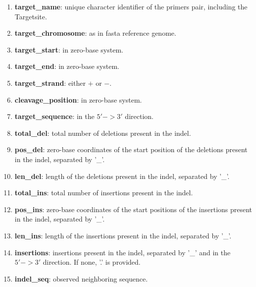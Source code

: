\documentclass[11pt, twoside]{article}
\begin{document}
\begin{enumerate}
\item {\bf target\_name}: unique character identifier of the primers
  pair, including the Targetsite.

\item {\bf target_chromosome}: as in fasta reference genome.

\item {\bf target_start}: in zero-base system.

\item {\bf target_end}: in zero-base system.

\item {\bf target_strand}: either $+$ or $-$.

\item {\bf cleavage\_position}: in zero-base system.

\item {\bf target\_sequence}: in the $5' -> 3'$ direction.

\item {\bf total\_del}: total number of deletions present in the indel.

\item {\bf pos\_del}: zero-base coordinates of the start position of the deletions present in the indel, separated by '\_'.

\item {\bf len\_del}: length of the deletions present in the indel, separated by '\_'.

\item {\bf total\_ins}: total number of insertions present in the indel.

\item {\bf pos\_ins}: zero-base coordinates of the start positions of the insertions present in the indel, separated by '\_'.

\item {\bf len\_ins}: length of the insertions present in the indel, separated by '\_'.

\item {\bf insertions}: insertions present in the indel, separated by '\_' and in the $5' -> 3'$ direction.
  If none, '.' is provided.

\item {\bf indel_seq}: observed neighboring sequence.
\end{enumerate}

\vspace{1cm}
\end{document}
